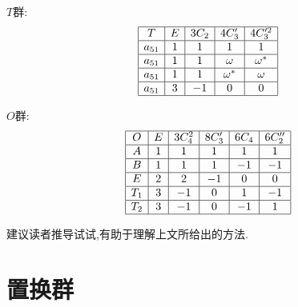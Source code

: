 \documentclass{ctexart}
\begin{document}
$T$群:
\[
\begin{array}{|c|c|c|c|c|}
\hline
T&E&3C_{2}&4C_{3}'&4C_{3}'^{2}\\
\hline
a_{51} &1&1&1&1\\
\hline
a_{51} &1&1&\omega&\omega^{*}\\
\hline
a_{51} &1&1&\omega^{*}&\omega\\
\hline
a_{51} &3&-1&0&0\\
\hline

\end{array}
\]

$O$群:
\[
\begin{array}{|c|c|c|c|c|c|}
\hline
O&E&3C_{4}^{2}&8C_{3}'&6C_{4}&6C_{2}''\\
\hline
A&1&1&1&1&1\\
\hline
B&1&1&1&-1&-1\\
\hline
E&2&2&-1&0&0\\
\hline
T_{1}&3&-1&0&1&-1\\
\hline
T_{2}&3&-1&0&-1&1\\
\hline
\end{array}
\]

建议读者推导试试,有助于理解上文所给出的方法.

\section{置换群}
\end{document}
